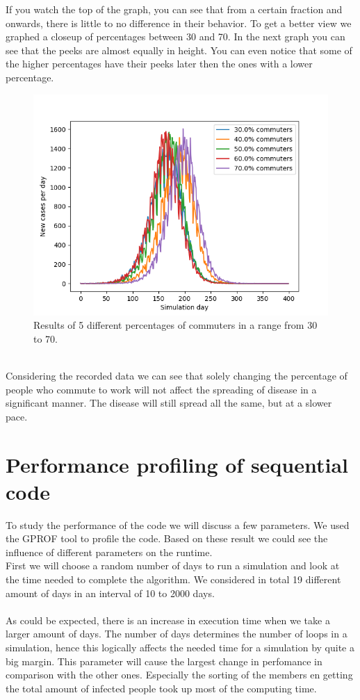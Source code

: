 \documentclass[runningheads]{llncs}
\begin{document}
If you watch the top of the graph, you can see that from a certain fraction and onwards, there is little to no difference in their behavior. To get a better view we graphed a closeup of percentages between 30 and 70. In the next graph you can see that the peeks are almost equally in height. You can even notice that some of the higher percentages have their peeks later then the ones with a lower percentage. 
\begin{figure}
	\includegraphics[width=\textwidth]{test_30-70.png}
	\caption{Results of 5 different percentages of commuters in a range from 30 to 70.}
\end{figure}
\\
Considering the recorded data we can see that solely changing the percentage of people who commute to work will not affect the spreading of disease in a significant manner. The disease will still spread all the same, but at a slower pace. 

\newpage
\section{Performance profiling of sequential code}
To study the performance of the code we will discuss a few parameters. We used the GPROF tool to profile the code. Based on these result we could see the influence of different parameters on the runtime.
\\
First we will choose a random number of days to run a simulation and look at the time needed to complete the algorithm. We considered in total 19 different amount of days in an interval of 10 to 2000 days. \\ 
\\
As could be expected, there is an increase in execution time when we take a larger amount of days. The number of days determines the number of loops in a simulation, hence this logically affects the needed time for a simulation by quite a big margin. This parameter will cause the largest change in perfomance in comparison with the other ones. Especially the sorting of the members en getting the total amount of infected people took up most of the computing time.
\end{document}
